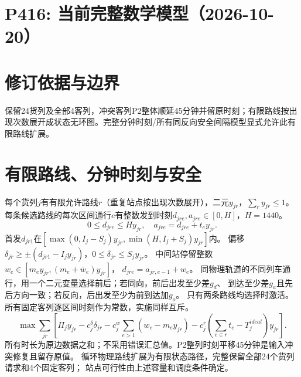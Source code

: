 \documentclass[11pt]{ctexart}
\begin{document}
\section*{P416: 当前完整数学模型（2026-10-20）}
\section*{修订依据与边界}保留24货列及全部4客列，冲突客列P2整体顺延45分钟并留原时刻；有限路线按出现次数展开成状态无环图。完整分钟时刻/所有同反向安全间隔模型显式允许此有限路线扩展。

\section*{有限路线、分钟时刻与安全}
每个货列$j$有有限允许路线$r$（重复站点按出现次数展开），二元$y_{jr}$，$\sum_ry_{jr}\le1$。
每条候选路线的每次区间通行$e$有整数发到时刻$d_{jre},a_{jre}\in[0,H]$，$H=1440$。
\[
0\le d_{jre}\le Hy_{jr},\quad a_{jre}=d_{jre}+t_e y_{jr}.
\]
首发$d_{jr1}$在$[\max(0,I_j-S_j)y_{jr},\min(H,I_j+S_j)y_{jr}]$内。
偏移$\delta_{jr}\ge\pm(d_{jr1}-I_jy_{jr})$，$0\le\delta_{jr}\le S_jy_{jr}$。
中间站停留整数$w_e\in[m_ey_{jr},(m_e+\bar w_e)y_{jr}]$，
$d_{jre}=a_{jr,e-1}+w_e$。
同物理轨道的不同列车通行，用一个二元变量选择前后；若同向，前后出发至少差$g_d$、
到达至少差$g_a$且先后方向一致；若反向，后出发至少为前到达加$g_o$。
只有两条路线均选择时激活。所有固定客列逐区间时刻作为常数，实施同样互斥。
\[
\max\sum_{jr}\left[
\Pi_jy_{jr}-c^\delta_j\delta_{jr}
-c^w_j\sum_{e>1}(w_e-m_ey_{jr})
-c^r_j(\sum_{e\in r}t_e-T_j^{ideal})y_{jr}\right].
\]
所有时长为原边数据之和；不采用错误汇总值。P2整列时刻平移45分钟是输入冲突修复且留存原值。
循环物理路线扩展为有限状态路径，完整保留全部24个货列请求和4个固定客列；
站点可行性由上述容量和调度条件确定。
\end{document}
